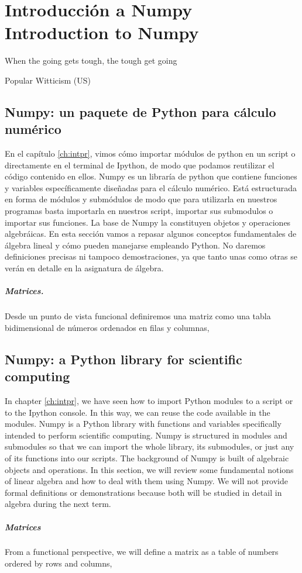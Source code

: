 \chapter{Introducción a Numpy\\ Introduction to Numpy} 
\epigraph{When the going gets tough, the tough get going}{Popular Witticism (US)}
\begin{paracol}{2}
\section{Numpy: un paquete de Python para cálculo nu\-mérico}
En el capítulo \ref{ch:intpr}, vimos cómo importar mó\-dulos de python en un script o directamente en el terminal de Ipython, de modo que podamos reutilizar el código contenido en ellos. Numpy es un libraría de python que contiene funciones y variables específicamente diseñadas para el cálculo numérico. Está estructurada en forma de módulos y submódulos de modo que para utilizarla en nuestros programas basta  importarla en nuestros script, importar sus submodulos o importar sus funciones.
La base de Numpy la constituyen objetos y operaciones algebráicas. En esta sección vamos a repasar algunos conceptos fundamentales de  álgebra lineal y cómo pueden manejarse empleando Python. No daremos definiciones precisas ni tampoco demostraciones, ya que tanto unas como otras se verán en detalle en la asignatura de álgebra.

\paragraph{Matrices.} Desde un punto de vista funcional definiremos una matriz como una tabla bidimensional de números ordenados en filas y columnas,
\switchcolumn

\section{Numpy: a Python library for scientific computing}
In chapter \ref{ch:intpr}, we have seen how to import Python modules to a script or to the Ipython console. In this way, we can reuse the code available in the modules. Numpy is a Python library with functions and variables specifically intended to perform scientific computing. Numpy is structured in modules and submodules so that we can import the whole library, its submodules, or just any of its functions into our scripts. The background of Numpy is built of algebraic objects and operations. In this section, we will review some fundamental notions of linear algebra and how to deal with them using Numpy. We will not provide formal definitions or demonstrations because both will be studied in detail in algebra during the next term.
\paragraph{Matrices} From a functional perspective, we will define a matrix as a table of numbers ordered by rows and columns,
\end{paracol}

